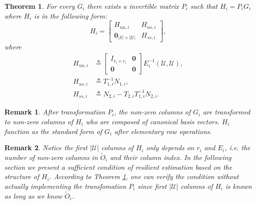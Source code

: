 \documentclass[12pt]{article}
\newcommand{\Uc}{{\mathcal{U}}}
\newcommand{\Sc}{{\mathcal{S}}}
\newcommand{\Oi}{{\tilde{O}_i}}
\newtheorem{theorem}{\textbf{Theorem}}
\newtheorem{remark}{\textbf{Remark}}
\begin{document}
\begin{theorem}\label{th:Si_form}
	For every $G_i$ there exists a invertible matrix $P_i$ such that $H_i=P_i G_i$ where $H_i$ is in the following form:
	\begin{equation}
	H_i=\begin{bmatrix}
		H_{uu,i}	& 	H_{us,i} \\
		\mathbf{0}_{|\Sc|\times|\Uc|} & H_{ss,i}
	\end{bmatrix}
	,
	\end{equation}
where 
\begin{align*}
H_{uu,i} & \triangleq 	
\begin{bmatrix}
I_{r_i\times r_i} & \mathbf{0} \\
	\mathbf{0} & \mathbf{0} 
\end{bmatrix}
E_i^{-1}(\Uc,\Uc),\\
H_{us,i}& \triangleq T^{-1}_{1,i} N_{1,i},
\\
H_{ss,i}& \triangleq N_{2,i}-T_{2,i} T^{-1}_{1,i} N_{2,i}.
\end{align*}

\end{theorem}

\begin{remark}
	After transformation $P_i$, the non-zero columns of $G_i$ are transformed to non-zero columns of $H_i$ who are composed of canonical basis vectors. $H_i$ function as the standard form of $G_i$ after elementary row operations. 
\end{remark}
\begin{remark}
	Notice the first $|\Uc|$ columns of $H_i$ only depends on $r_i$ and $E_i$, i.e. the number of non-zero columns in $\Oi$ and their column index.
	In the following section we present a sufficient condition of resilient estimation based on the structure of $H_i$. 
	According to Theorem \ref{th:Si_form}, one can verify the condition without actually implementing the transfomation $P_i$ since first $|\Uc|$ columns of $H_i$ is known as long as we know $\Oi$. 
\end{remark}
\end{document}
